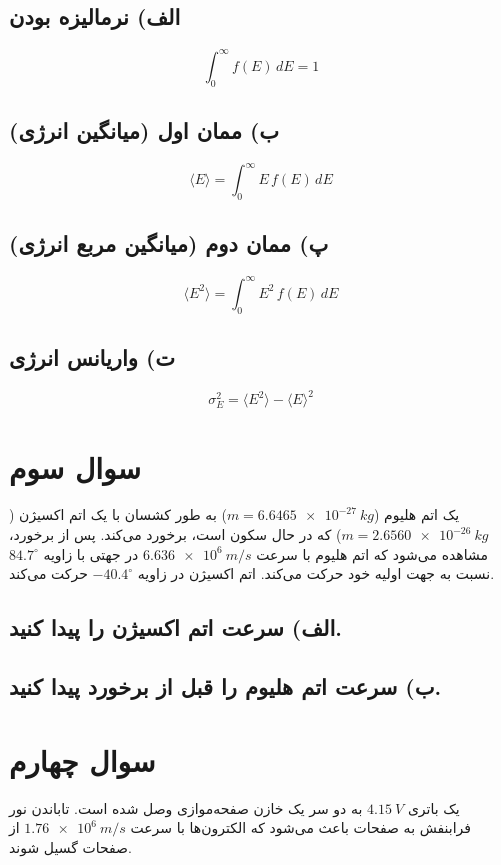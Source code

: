 \documentclass[a4paper,16pt]{article}
\begin{document}
		\subsection*{الف) نرمالیزه بودن}
		\[
		\int_0^\infty f(E) \, dE = 1
		\]
		
		\subsection*{ب) ممان اول (میانگین انرژی)}
		\[
		\langle E \rangle = \int_0^\infty E \, f(E) \, dE
		\]
		
		\subsection*{پ) ممان دوم (میانگین مربع انرژی)}
		\[
		\langle E^2 \rangle = \int_0^\infty E^2 \, f(E) \, dE
		\]
		
		\subsection*{ت) واریانس انرژی}
		\[
		\sigma_E^2 = \langle E^2 \rangle - \langle E \rangle^2
		\]
		
		
		
	\section{سوال سوم}

	
	یک اتم هلیوم ($m = \SI{6.6465e-27}{kg}$) به طور کشسان با یک اتم اکسیژن ($m = \SI{2.6560e-26}{kg}$) که در حال سکون است، برخورد می‌کند. پس از برخورد، مشاهده می‌شود که اتم هلیوم با سرعت $\SI{6.636e6}{m/s}$ در جهتی با زاویه $84.7^{\circ}$ نسبت به جهت اولیه خود حرکت می‌کند. اتم اکسیژن در زاویه $-40.4^{\circ}$ حرکت می‌کند.
	\\
	
	 \subsection*{الف) سرعت اتم اکسیژن را پیدا کنید.}
	 \subsection*{ب) سرعت اتم هلیوم را قبل از برخورد پیدا کنید.}
\newpage
	
	\section{سوال چهارم}
	
	یک باتری $\SI{4.15}{V}$ به دو سر یک خازن صفحه‌موازی وصل شده است. تاباندن نور فرابنفش به صفحات باعث می‌شود که الکترون‌ها با سرعت $\SI{1.76e6}{m/s}$ از صفحات گسیل شوند.
	\\
\end{document}
